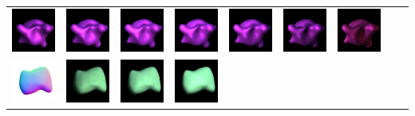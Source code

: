 \begin{center}
\begin{longtable}{@{}c@{}c@{}c@{}c@{}c@{}c@{}c@{}c@{}c@{}}
\includegraphics[width=0.1\linewidth]{training/39_1.png} & \includegraphics[width=0.1\linewidth]{training/39_2.png} &
\includegraphics[width=0.1\linewidth]{training/39_3.png} & \includegraphics[width=0.1\linewidth]{training/39_4.png} &
\includegraphics[width=0.1\linewidth]{training/39_5.png} & \includegraphics[width=0.1\linewidth]{training/39_6.png} &
\includegraphics[width=0.1\linewidth]{training/39_7.png} \\
\includegraphics[width=0.1\linewidth]{training/40_gt.png} & \includegraphics[width=0.1\linewidth]{training/40_0.png} &
\includegraphics[width=0.1\linewidth]{training/40_1.png} & \includegraphics[width=0.1\linewidth]{training/40_2.png} &

\end{longtable}
\end{center}
